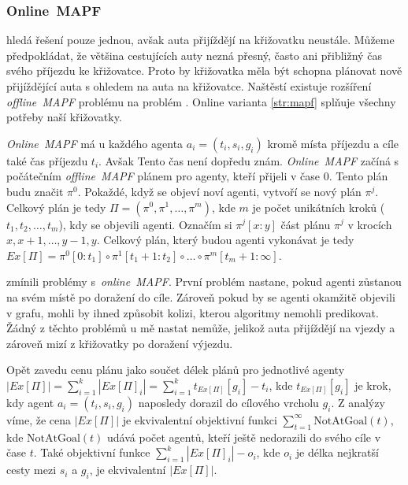 \subsubsection{Online~MAPF}\label{subsubsec:online_mapf}

%

 hledá řešení pouze jednou, avšak auta přijíždějí na křižovatku neustále.
Můžeme předpokládat, že většina cestujících auty nezná přesný, často ani přibližný čas svého příjezdu ke křižovatce.
Proto by křižovatka měla být schopna plánovat nově přijíždějící auta s ohledem na auta na křižovatce.
Naštěstí existuje rozšíření \emph{offline~MAPF} problému na problém  \citet*{Svancara}.
Online varianta \ref{str:mapf} splňuje všechny potřeby naší křižovatky.

\emph{Online~MAPF} má u každého agenta $a_i = (t_i, s_i, g_i)$ kromě místa příjezdu a cíle také čas příjezdu $t_i$.
Avšak Tento čas není dopředu znám.
\emph{Online~MAPF} začíná s počátečním \emph{offline~MAPF} plánem pro agenty, kteří přijeli v čase $0$.
Tento plán budu značit $\pi^0$.
Pokaždé, když se objeví noví agenti, vytvoří se nový plán $\pi^j$.
Celkový plán je tedy $\Pi = (\pi^0, \pi^1, \dots, \pi^m)$, kde $m$ je počet unikátních kroků ($t_1, t_2, \dots, t_m$), kdy se objevili agenti.
Označím si $\pi^j[x:y]$ část plánu $\pi^j$ v krocích $x, x + 1, \dots, y - 1, y$.
Celkový plán, který budou agenti vykonávat je tedy $Ex[\Pi] = \pi^0[0:t_1] \circ \pi^1[t_1 + 1:t_2] \circ \dots \circ \pi^m[t_m + 1:\infty]$.

\citet{Svancara} zmínili problémy s~\emph{online~MAPF}.
První problém nastane, pokud agenti zůstanou na svém místě po doražení do cíle.
Zároveň pokud by se agenti okamžitě objevili v grafu, mohli by ihned způsobit kolizi, kterou algoritmy nemohli predikovat.
Žádný z těchto problémů u mě nastat nemůže, jelikož auta přijíždějí na vjezdy
a zároveň mizí z křižovatky po doražení výjezdu.

Opět zavedu cenu plánu jako součet délek plánů pro jednotlivé agenty $|Ex[\Pi]| = \sum_{i=1}^{k} |Ex[\Pi]_i| = \sum_{i=1}^{k} t_{Ex[\Pi]}[g_i] - t_i$,
kde $t_{Ex[\Pi]}[g_i]$ je krok, kdy agent $a_i = (t_i, s_i, g_i)$ naposledy dorazil do cílového vrcholu $g_i$.
Z analýzy \citet{Svancara} víme, že cena $|Ex[\Pi]|$ je ekvivalentní objektivní funkci $\sum_{t=1}^{\infty} \textrm{NotAtGoal}(t)$,
kde $\textrm{NotAtGoal}(t)$ udává počet agentů, kteří ještě nedorazili do svého cíle v čase $t$.
Také objektivní funkce $\sum_{i=1}^{k} |Ex[\Pi]_i| - o_i$, kde $o_i$ je délka nejkratší cesty mezi $s_i$ a $g_i$,
je ekvivalentní $|Ex[\Pi]|$.


